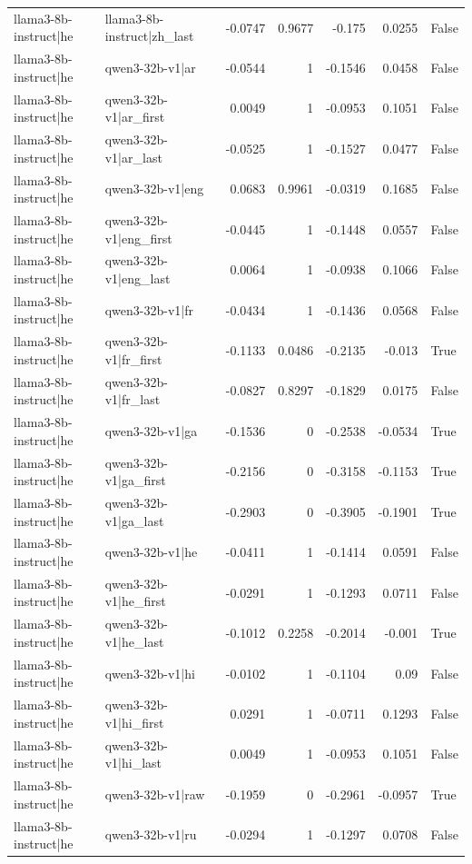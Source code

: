 \begin{table}
\begin{tabular}{l l r r r r l}
llama3-8b-instruct|he & llama3-8b-instruct|zh_last & -0.0747 & 0.9677 & -0.175 & 0.0255 & False \\
llama3-8b-instruct|he & qwen3-32b-v1|ar & -0.0544 & 1 & -0.1546 & 0.0458 & False \\
llama3-8b-instruct|he & qwen3-32b-v1|ar_first & 0.0049 & 1 & -0.0953 & 0.1051 & False \\
llama3-8b-instruct|he & qwen3-32b-v1|ar_last & -0.0525 & 1 & -0.1527 & 0.0477 & False \\
llama3-8b-instruct|he & qwen3-32b-v1|eng & 0.0683 & 0.9961 & -0.0319 & 0.1685 & False \\
llama3-8b-instruct|he & qwen3-32b-v1|eng_first & -0.0445 & 1 & -0.1448 & 0.0557 & False \\
llama3-8b-instruct|he & qwen3-32b-v1|eng_last & 0.0064 & 1 & -0.0938 & 0.1066 & False \\
llama3-8b-instruct|he & qwen3-32b-v1|fr & -0.0434 & 1 & -0.1436 & 0.0568 & False \\
llama3-8b-instruct|he & qwen3-32b-v1|fr_first & -0.1133 & 0.0486 & -0.2135 & -0.013 & True \\
llama3-8b-instruct|he & qwen3-32b-v1|fr_last & -0.0827 & 0.8297 & -0.1829 & 0.0175 & False \\
llama3-8b-instruct|he & qwen3-32b-v1|ga & -0.1536 & 0 & -0.2538 & -0.0534 & True \\
llama3-8b-instruct|he & qwen3-32b-v1|ga_first & -0.2156 & 0 & -0.3158 & -0.1153 & True \\
llama3-8b-instruct|he & qwen3-32b-v1|ga_last & -0.2903 & 0 & -0.3905 & -0.1901 & True \\
llama3-8b-instruct|he & qwen3-32b-v1|he & -0.0411 & 1 & -0.1414 & 0.0591 & False \\
llama3-8b-instruct|he & qwen3-32b-v1|he_first & -0.0291 & 1 & -0.1293 & 0.0711 & False \\
llama3-8b-instruct|he & qwen3-32b-v1|he_last & -0.1012 & 0.2258 & -0.2014 & -0.001 & True \\
llama3-8b-instruct|he & qwen3-32b-v1|hi & -0.0102 & 1 & -0.1104 & 0.09 & False \\
llama3-8b-instruct|he & qwen3-32b-v1|hi_first & 0.0291 & 1 & -0.0711 & 0.1293 & False \\
llama3-8b-instruct|he & qwen3-32b-v1|hi_last & 0.0049 & 1 & -0.0953 & 0.1051 & False \\
llama3-8b-instruct|he & qwen3-32b-v1|raw & -0.1959 & 0 & -0.2961 & -0.0957 & True \\
llama3-8b-instruct|he & qwen3-32b-v1|ru & -0.0294 & 1 & -0.1297 & 0.0708 & False \\

\end{tabular}
\end{table}
